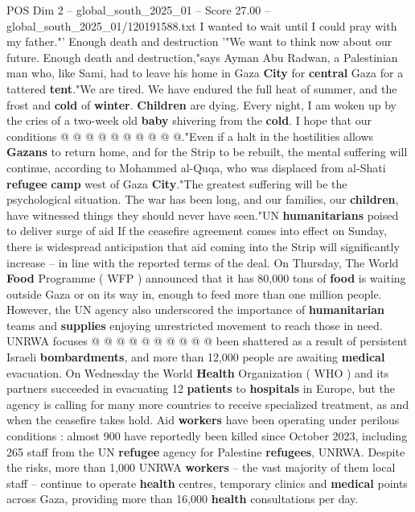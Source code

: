 \begin{textsample}{POS Dim 2 – global\_south\_2025\_01 – Score 27.00 – global\_south\_2025\_01/120191588.txt}
I wanted to wait until I could pray with my father."' Enough death and destruction '"We want to think now about our future.
Enough death and destruction,"says Ayman Abu Radwan, a Palestinian man who, like Sami, had to leave his home in Gaza \textbf{City} for \textbf{central} Gaza for a tattered \textbf{tent}."We are tired.
We have endured the full heat of summer, and the frost and \textbf{cold} of \textbf{winter}. \textbf{Children} are dying.
Every night, I am woken up by the cries of a two-week old \textbf{baby} shivering from the \textbf{cold}.
I hope that our conditions @ @ @ @ @ @ @ @ @ @."Even if a halt in the hostilities allows \textbf{Gazans} to return home, and for the Strip to be rebuilt, the mental suffering will continue, according to Mohammed al-Quqa, who was displaced from al-Shati \textbf{refugee} \textbf{camp} west of Gaza \textbf{City}."The greatest suffering will be the psychological situation.
The war has been long, and our families, our \textbf{children}, have witnessed things they should never have seen."UN \textbf{humanitarians} poised to deliver surge of aid If the ceasefire agreement comes into effect on Sunday, there is widespread anticipation that aid coming into the Strip will significantly increase -- in line with the reported terms of the deal.
On Thursday, The World \textbf{Food} Programme ( WFP ) announced that it has 80,000 tons of \textbf{food} is waiting outside Gaza or on its way in, enough to feed more than one million people.
However, the UN agency also underscored the importance of \textbf{humanitarian} teams and \textbf{supplies} enjoying unrestricted movement to reach those in need.
UNRWA focuses @ @ @ @ @ @ @ @ @ @ been shattered as a result of persistent Israeli \textbf{bombardments}, and more than 12,000 people are awaiting \textbf{medical} evacuation.
On Wednesday the World \textbf{Health} Organization ( WHO ) and its partners succeeded in evacuating 12 \textbf{patients} to \textbf{hospitals} in Europe, but the agency is calling for many more countries to receive specialized treatment, as and when the ceasefire takes hold.
Aid \textbf{workers} have been operating under perilous conditions : almost 900 have reportedly been killed since October 2023, including 265 staff from the UN \textbf{refugee} agency for Palestine \textbf{refugees}, UNRWA.
Despite the risks, more than 1,000 UNRWA \textbf{workers} -- the vast majority of them local staff -- continue to operate \textbf{health} centres, temporary clinics and \textbf{medical} points across Gaza, providing more than 16,000 \textbf{health} consultations per day.

\end{textsample}
